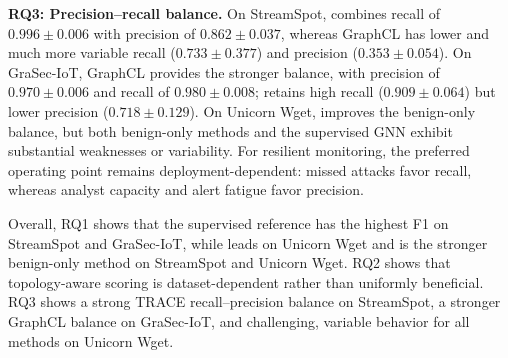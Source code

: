 \noindent\textbf{RQ3: Precision--recall balance.}
On StreamSpot, \sysname{} combines recall of $0.996 \pm 0.006$ with precision of $0.862 \pm 0.037$, whereas GraphCL has lower and much more variable recall ($0.733 \pm 0.377$) and precision ($0.353 \pm 0.054$). On GraSec-IoT, GraphCL provides the stronger balance, with precision of $0.970 \pm 0.006$ and recall of $0.980 \pm 0.008$; \sysname{} retains high recall ($0.909 \pm 0.064$) but lower precision ($0.718 \pm 0.129$). On Unicorn Wget, \sysname{} improves the benign-only balance, but both benign-only methods and the supervised GNN exhibit substantial weaknesses or variability. For resilient monitoring, the preferred operating point remains deployment-dependent: missed attacks favor recall, whereas analyst capacity and alert fatigue favor precision.

Overall, RQ1 shows that the supervised reference has the highest F1 on StreamSpot and GraSec-IoT, while \sysname{} leads on Unicorn Wget and is the stronger benign-only method on StreamSpot and Unicorn Wget. RQ2 shows that topology-aware scoring is dataset-dependent rather than uniformly beneficial. RQ3 shows a strong TRACE recall--precision balance on StreamSpot, a stronger GraphCL balance on GraSec-IoT, and challenging, variable behavior for all methods on Unicorn Wget.
